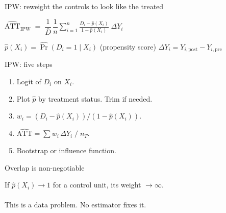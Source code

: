 \documentclass[aspectratio=169,11pt]{beamer}
\begin{document}
\begin{frame}{IPW: reweight the controls to look like the treated}
\vspace{1.0em}
\begin{center}
\large
$\widehat{\mathrm{ATT}}_{\mathrm{IPW}}
  \;=\; \dfrac{1}{\bar{D}}\,\dfrac{1}{n}
        \displaystyle\sum_{i=1}^{n}
        \frac{D_i - \hat{p}(X_i)}{1 - \hat{p}(X_i)}
        \;\Delta Y_i$
\end{center}
\vspace{0.8em}
\begin{center}
\color{warmgray}\small
$\hat{p}(X_i) = \widehat{\Pr}(D_i=1\mid X_i)$ \quad (propensity score)
\qquad
$\Delta Y_i = Y_{i,\mathrm{post}} - Y_{i,\mathrm{pre}}$
\end{center}
\end{frame}

\begin{frame}{IPW: five steps}
\vspace{0.8em}
\begin{enumerate}\setlength\itemsep{0.5em}
  \item {} \;Logit of $D_i$ on $X_i$.
  \item {} \;Plot $\hat{p}$ by treatment status. Trim if needed.
  \item {} \;$w_i = (D_i - \hat{p}(X_i)) / (1 - \hat{p}(X_i))$.
  \item {} \;$\widehat{\mathrm{ATT}} = \sum w_i\,\Delta Y_i \;/\; n_T$.
  \item {} \;Bootstrap or influence function.
\end{enumerate}
\end{frame}

\begin{frame}{Overlap is non-negotiable}
\vspace{1.2em}
\begin{center}
\large
If $\hat{p}(X_i) \to 1$ for a control unit, its weight $\to \infty$.\\[0.8em]
\\[0.8em]
\color{warmgray}\normalsize
This is a data problem. No estimator fixes it.
\end{center}
\end{frame}

\end{document}
